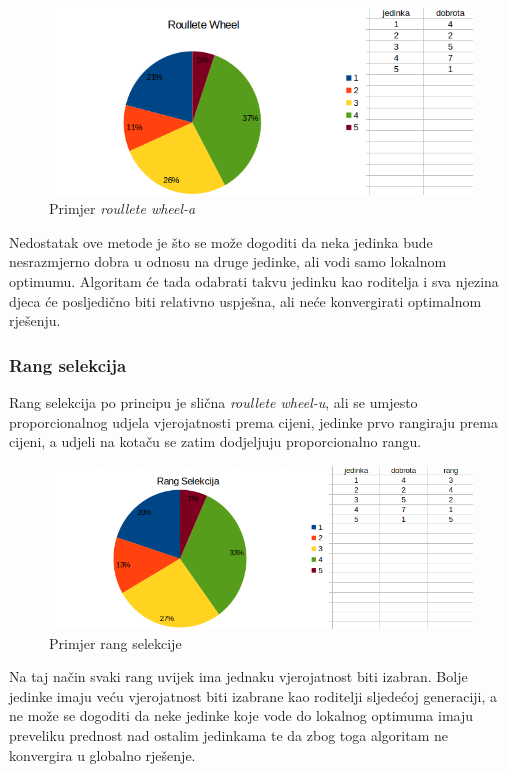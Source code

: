 \documentclass[times, utf8, zavrsni, numeric]{fer}
\begin{document}
\begin{figure}[htb]
\centering
\includegraphics[width=14cm]{images/roullete_wheel_selection.png}
\caption{Primjer \textit{roullete wheel-a}}
\label{fig:roullete wheel}
\end{figure}

Nedostatak ove metode je što se može dogoditi da neka jedinka bude nesrazmjerno dobra u odnosu na druge jedinke, ali vodi samo lokalnom optimumu. Algoritam će tada odabrati takvu jedinku kao roditelja i sva njezina djeca će posljedično biti relativno uspješna, ali neće konvergirati optimalnom rješenju.

\subsubsection{Rang selekcija}
Rang selekcija po principu je slična \textit{roullete wheel-u}, ali se umjesto proporcionalnog udjela vjerojatnosti prema cijeni, jedinke prvo rangiraju prema cijeni, a udjeli na kotaču se zatim dodjeljuju proporcionalno rangu.

\begin{figure}[htb]
\centering
\includegraphics[width=14cm]{images/rang_selekcija.png}
\caption{Primjer rang selekcije}
\label{fig:rang selekcija}
\end{figure}

Na taj način svaki rang uvijek ima jednaku vjerojatnost biti izabran. Bolje jedinke imaju veću vjerojatnost biti izabrane kao roditelji sljedećoj generaciji, a ne može se dogoditi da neke jedinke koje vode do lokalnog optimuma imaju preveliku prednost nad ostalim jedinkama te da zbog toga algoritam ne konvergira u globalno rješenje.
\end{document}
